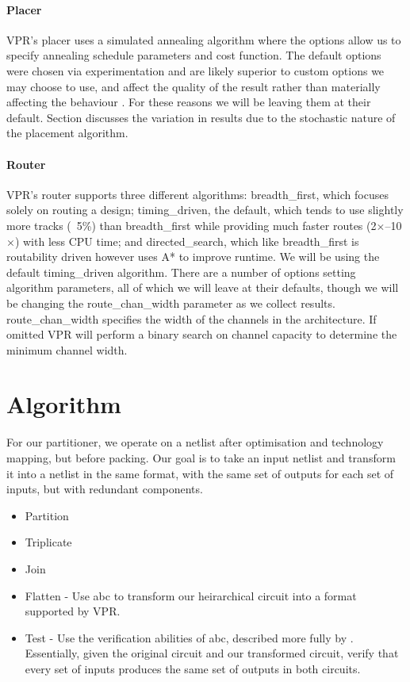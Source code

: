 \documentclass[12pt,final,oneside]{dwThesis} %
\begin{document}
\subsubsection{Placer}
\ac{VPR}'s placer uses a simulated annealing algorithm where the options allow us to specify annealing schedule parameters and cost function. The default options were chosen via experimentation and are likely superior to custom options we may choose to use, and affect the quality of the result rather than materially affecting the behaviour \cite{VPRManual, VPRBook}. For these reasons we will be leaving them at their default.
Section  discusses the variation in results due to the stochastic nature of the placement algorithm.
\subsubsection{Router}
\ac{VPR}'s router supports three different algorithms: breadth\_first, which focuses solely on routing a design; timing\_driven, the default, which tends to use slightly more tracks (~5\%) than breadth\_first while providing much faster routes (2$\times$--10$\times$) with less CPU time; and directed\_search, which like breadth\_first is routability driven however uses A* to improve runtime. We will be using the default timing\_driven algorithm.
There are a number of options setting algorithm parameters, all of which we will leave at their defaults, though we will be changing the route\_chan\_width parameter as we collect results. route\_chan\_width specifies the width of the channels in the architecture. If omitted \ac{VPR} will perform a binary search on channel capacity to determine the minimum channel width.


\chapter{Algorithm}
For our partitioner, we operate on a netlist after optimisation and technology mapping, but before packing. Our goal is to take an input netlist and transform it into a netlist in the same format, with the same set of outputs for each set of inputs, but with redundant components.

\begin{itemize}
   \item Partition
   \item Triplicate
   \item Join
   \item Flatten - Use abc to transform our heirarchical circuit into a format supported by VPR.
   \item Test - Use the verification abilities of abc, described more fully by . Essentially, given the original circuit and our transformed circuit, verify that every set of inputs produces the same set of outputs in both circuits.

\end{itemize}
\end{document}
